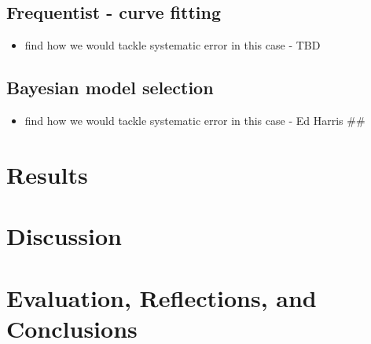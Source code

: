 \documentclass[]{article}
\providecommand{\tightlist}{%
  \setlength{\itemsep}{0pt}\setlength{\parskip}{0pt}}
\begin{document}
\hypertarget{frequentist---curve-fitting}{%
\subsection{Frequentist - curve
fitting}\label{frequentist---curve-fitting}}

\begin{itemize}
\tightlist
\item
  find how we would tackle systematic error in this case - TBD
\end{itemize}

\hypertarget{bayesian-model-selection}{%
\subsection{Bayesian model selection}\label{bayesian-model-selection}}

\begin{itemize}
\tightlist
\item
  find how we would tackle systematic error in this case - Ed Harris
  \#\#
\end{itemize}

\hypertarget{results}{%
\section{Results}\label{results}}

\hypertarget{discussion}{%
\section{Discussion}\label{discussion}}

\hypertarget{evaluation-reflections-and-conclusions}{%
\section{Evaluation, Reflections, and
Conclusions}\label{evaluation-reflections-and-conclusions}}
\end{document}
